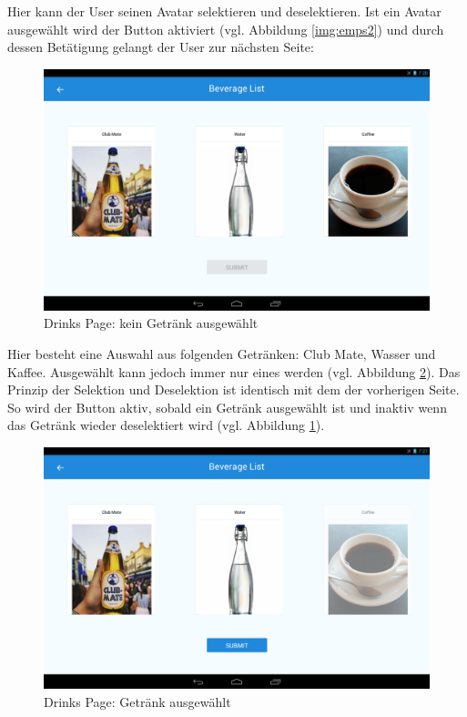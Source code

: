 Hier kann der User seinen Avatar selektieren und deselektieren. Ist ein Avatar ausgewählt wird der  Button aktiviert (vgl. Abbildung \ref{img:emps2}) und durch dessen Betätigung gelangt der User zur nächsten Seite: 

\begin{figure}[th!]
	\centering
	\includegraphics[width=.9\columnwidth]{./Abbildungen/Kapitel_03/drinks1.png}
	\caption{Drinks Page: kein Getränk ausgewählt}
	\label{img:drinks1}
\end{figure}

Hier besteht eine Auswahl aus folgenden Getränken: Club Mate, Wasser und Kaffee. 
Ausgewählt kann jedoch immer nur eines werden (vgl. Abbildung \ref{img:drinks2}).
Das Prinzip der Selektion und Deselektion ist identisch mit dem der vorherigen Seite. So wird der  Button aktiv, sobald ein Getränk ausgewählt ist und inaktiv wenn das Getränk wieder deselektiert wird (vgl. Abbildung \ref{img:drinks1}).\\

\begin{figure}[th!]
	\centering
	\includegraphics[width=.9\columnwidth]{./Abbildungen/Kapitel_03/drinks2.png}
	\caption{Drinks Page: Getränk ausgewählt}
	\label{img:drinks2}
\end{figure}

